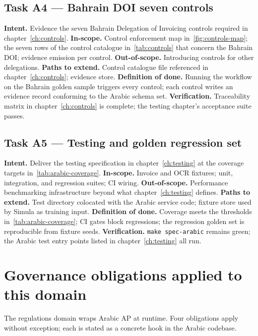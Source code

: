 \documentclass[11pt,a4paper,twoside]{report}
\begin{document}
\subsection*{Task A4 --- Bahrain DOI seven controls}
\textbf{Intent.} Evidence the seven Bahrain Delegation of Invoicing
controls required in chapter~\ref{ch:controls}.
\textbf{In-scope.} Control enforcement map in~\ref{fig:controls-map};
the seven rows of the control catalogue in~\ref{tab:controls} that
concern the Bahrain DOI; evidence emission per control.
\textbf{Out-of-scope.} Introducing controls for other delegations.
\textbf{Paths to extend.} Control catalogue file referenced in
chapter~\ref{ch:controls}; evidence store.
\textbf{Definition of done.} Running the workflow on the Bahrain
golden sample triggers every control; each control writes an
evidence record conforming to the Arabic schema set.
\textbf{Verification.} Traceability matrix in chapter~\ref{ch:controls}
is complete; the testing chapter's acceptance suite passes.

\subsection*{Task A5 --- Testing and golden regression set}
\textbf{Intent.} Deliver the testing specification in
chapter~\ref{ch:testing} at the coverage targets
in~\ref{tab:arabic-coverage}.
\textbf{In-scope.} Invoice and OCR fixtures; unit, integration, and
regression suites; CI wiring.
\textbf{Out-of-scope.} Performance benchmarking infrastructure beyond
what chapter~\ref{ch:testing} defines.
\textbf{Paths to extend.} Test directory colocated with the Arabic
service code; fixture store used by Simula as training input.
\textbf{Definition of done.} Coverage meets the thresholds
in~\ref{tab:arabic-coverage}; CI gates block regressions; the
regression golden set is reproducible from fixture seeds.
\textbf{Verification.} \texttt{make spec-arabic} remains green; the
Arabic test entry points listed in chapter~\ref{ch:testing} all run.


\section{Governance obligations applied to this domain}
\label{sec:agent-governance}
The regulations domain wraps Arabic AP at runtime. Four obligations
apply without exception; each is stated as a concrete hook in the
Arabic codebase.
\end{document}
